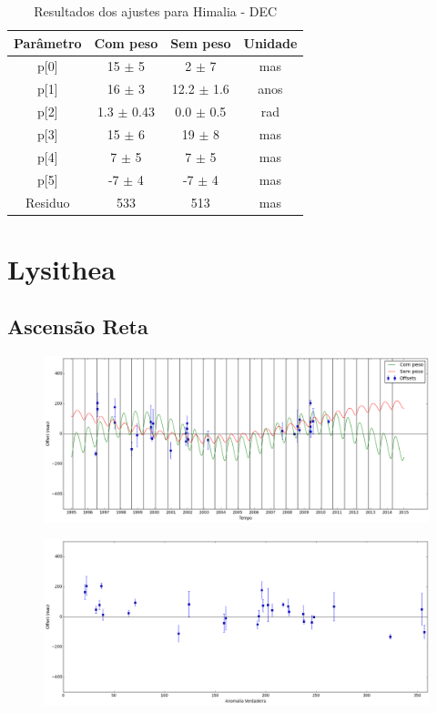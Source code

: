 \documentclass[11pt,a4paper]{report}
\begin{document}
\begin{table}[h!]
\caption{\label{Tab: Himalia-DEC} Resultados dos ajustes para Himalia - DEC}
\begin{centering}
\begin{tabular}{cccc}
\hline
\hline
Parâmetro & Com peso & Sem peso & Unidade\tabularnewline
\hline
p[0] & 15 $\pm$ 5 & 2 $\pm$ 7 & mas\\
p[1] & 16 $\pm$ 3 & 12.2 $\pm$ 1.6 & anos\\
p[2] & 1.3 $\pm$ 0.43 & 0.0 $\pm$ 0.5 & rad\\
p[3] & 15 $\pm$ 6 & 19 $\pm$ 8 & mas\\
p[4] & 7 $\pm$ 5 & 7 $\pm$ 5 & mas\\
p[5] & -7 $\pm$ 4 & -7 $\pm$ 4 & mas\\
Residuo & 533 & 513 & mas\\
\hline 
\end{tabular} 
\par\end{centering}
\end{table}

\chapter*{Lysithea}
\section*{Ascensão Reta}

\begin{figure}[h]
\includegraphics[scale=0.35]{Lysithea/RA.png} 
\end{figure}

\begin{figure}[h]
\includegraphics[scale=0.35]{Lysithea/RA_anom.png}  
\end{figure}
\end{document}
